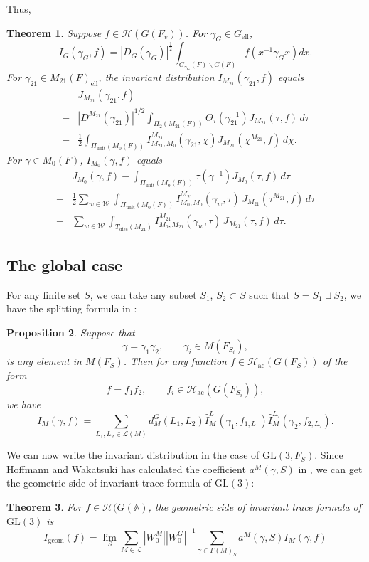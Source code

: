 \documentclass[11pt]{amsart}
\newtheorem {theorem}    {Theorem}[section]
\newtheorem {proposition}[theorem]    {Proposition}
\renewcommand{\rm}{\mathrm}
\newcommand{\GGL}{\mathrm{GL}}
\theoremstyle{definition}
\numberwithin{equation}{section}
\begin{document}
Thus,
	\begin{theorem}\label{main1}
		Suppose \(f\in\mathcal{H}(G(F_v))\). For \(\gamma_G\in G_{\rm{ell}}\), \[I_G(\gamma_G,f)=|D_G(\gamma_G)|^{\frac{1}{2}}\int_{G_{\gamma_G}(F)\backslash G(F)}f(x^{-1}\gamma_G x)dx.\] 
		For \(\gamma_{21}\in M_{21}(F)_{\rm{ell}}\), the invariant distribution \(I_{M_{21}}(\gamma_{21},f)\) equals 
        \begin{align*}
            &J_{M_{21}}(\gamma_{21},f)\\
-&
|D^{M_{21}}(\gamma_{21})|^{1/2}
\int_{\Pi_2(M_{21}(F))}
\Theta_\tau(\gamma_{21}^{-1})
J_{M_{21}}(\tau,f)\,d\tau\\
-&
\frac12
\int_{\Pi_{\mathrm{unit}}(M_0(F))}
I_{M_{21},M_0}^{M_{21}}(\gamma_{21},\chi)
J_{M_{21}}(\chi^{M_{21}},f)\,d\chi.
        \end{align*}
		For \(\gamma\in M_0(F)\),
		\(I_{M_0}(\gamma,f)\) equals 
		\begin{align*}
			&J_{M_0}(\gamma,f)-
\int_{\Pi_{\mathrm{unit}}(M_0(F))}
\tau(\gamma^{-1})J_{M_0}(\tau,f)\,d\tau\\
-&
\frac12\sum_{w\in\mathscr W}
\int_{\Pi_{\mathrm{unit}}(M_0(F))}
I_{M_0,M_0}^{M_{21}}(\gamma_w,\tau)\,
J_{M_{21}}(\tau^{M_{21}},f)\,d\tau\\
-&
\sum_{w\in\mathscr W}
\int_{T_{\mathrm{disc}}(M_{21})}
I_{M_0,M_{21}}^{M_{21}}(\gamma_w,\tau)\,
J_{M_{21}}(\tau,f)\,d\tau.
		\end{align*}
	\end{theorem}
    \subsection{The global case}
	For any finite set \(S\), we can take any subset \(S_1\), \(S_2\subset S\) such that \(S=S_1\sqcup S_2\), we have the splitting formula in \cite{Art88(1)}:
	\begin{proposition}
		Suppose that
		\[
		\gamma = \gamma_1 \gamma_2, \qquad \gamma_i \in M(F_{S_i}),
		\]is any element in \(M(F_S)\). Then for any function \(f \in \mathscr{H}_{\mathrm{ac}}(G(F_S))\) of the form
		\[
		f = f_1 f_2, \qquad f_i \in \mathscr{H}_{\mathrm{ac}}(G(F_{S_i})),
		\]
		we have
		\[
		I_M(\gamma, f) = \sum_{L_1, L_2 \in \mathcal{L}(M)} d_M^G(L_1, L_2) \widehat{I}_M^{L_1}(\gamma_1, f_{1, L_1}) \widehat{I}_M^{L_2}(\gamma_2, f_{2, L_2}).
		\]
	\end{proposition}
	We can now write the invariant distribution in the case of \(\GGL(3,F_S)\). Since Hoffmann and Wakatsuki has calculated the coefficient \(a^M(\gamma,S)\) in \cite{HW}, we can get the geometric side of invariant trace formula of \(\GGL(3)\):
	\begin{theorem}\label{main2}
		For \(f\in\mathcal{H}(G(\mathbb{A})\), the geometric side of invariant trace formula of \(\GGL(3)\) is 
		\[
		I_{\rm{geom}}(f) = \lim_{S} \sum_{M \in \mathcal{L}} |W_0^M| |W_0^G|^{-1} \sum_{\gamma \in \Gamma(M)_S} a^M(\gamma,S) I_M(\gamma, f)
		\]
	\end{theorem}
	
\end{document}
